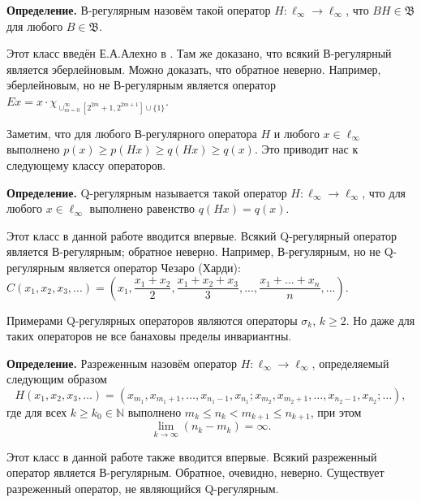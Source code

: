 \documentclass[a4paper,14pt]{article}
\begin{document}
	\textbf{Определение.}
	В-регулярным назовём такой оператор $H:\ell_\infty \to \ell_\infty$,
	что $B H \in \mathfrak B$ для любого $B\in \mathfrak B$.

	Этот класс введён Е.А.Алехно в
	\cite{alekhno2018invariant}.
	Там же доказано, что всякий В-регулярный является эберлейновым.
	Можно доказать, что обратное неверно.
	Например, эберлейновым, но не В-регулярным является оператор
	$
	Ex = x \cdot \chi_{\cup_{m=0}^{\infty}\left[2^{2 m}+1, 2^{2 m+1}\right] \cup\{1\}}
	$.

	Заметим, что для любого В-регулярного оператора $H$ и любого $x\in \ell_\infty$ выполнено
	$p(x) \geq p(Hx) \geq q(Hx) \geq q(x)$.
	Это приводит нас к следующему классу операторов.

	\textbf{Определение.} Q-регулярным называется такой оператор $H:\ell_\infty\to \ell_\infty$,
	что для любого $x\in\ell_\infty$ выполнено равенство $q(Hx) = q(x)$.


	Этот класс в данной работе вводится впервые.
	Всякий Q-регулярный оператор является В-регулярным;
	обратное неверно.
	Например, В-регулярным, но не Q-регулярным является оператор Чезаро (Харди):
	$
	C (x_1, x_2, x_3, ...) = \left(
	x_1,
	\dfrac{x_1+x_2}2,
	\dfrac{x_1+x_2 + x_3}3,
	...,
	\dfrac{x_1+...+x_n}n,
	...\right)
	.
	$


	Примерами Q-регулярных операторов являются операторы $\sigma_k$, $k\ge 2$.
	Но даже для таких операторов не все банаховы пределы инвариантны.

	\textbf{Определение.}
	Разреженным назовём оператор $H: \ell_\infty \to \ell_\infty$,
	определяемый следующим образом
	$$
	H(x_1, x_2, x_3, \ldots) = (x_{m_1}, x_{m_1 + 1}, \ldots, x_{n_1 - 1}, x_{n_1};
	x_{m_2}, x_{m_2 + 1}, \ldots, x_{n_2 - 1}, x_{n_2}; \ldots),
	$$
	где для всех
	$k \geqslant k_0 \in \mathbb N$
	выполнено
	$
	m_k \leqslant n_k < m_{k+1}\leqslant n_{k+1}
	$,
	при этом
	$$
	\lim\limits_{k \to \infty} (n_k - m_k) = \infty
	.
	$$

	Этот класс в данной работе также вводится впервые.
	Всякий разреженный оператор является В-регулярным.
	Обратное, очевидно, неверно.
	Существует разреженный оператор, не являющийся Q-регулярным.


	\setcounter{equation}{0}
	\setcounter{figure}{0}
\end{document}
